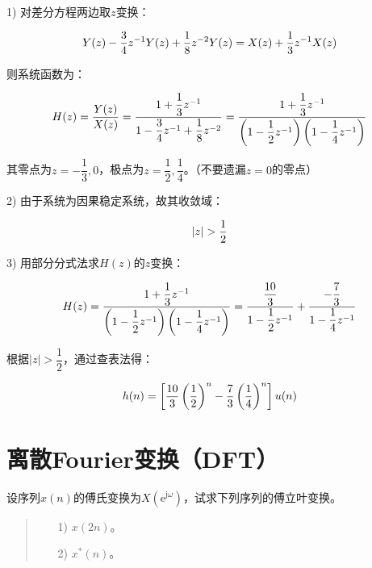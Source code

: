 \documentclass[cn, hazy, blue, normal, 14pt]{elegantnote}
\begin{document}
\begin{solution}[print=true]
    
1) 对差分方程两边取$z$变换：

\begin{equation}
\notag
    Y(z)-\frac{3}{4}z^{-1}Y(z)+\frac{1}{8}z^{-2}Y(z)=X(z)+\frac{1}{3}z^{-1}X(z)
\end{equation}

则系统函数为：

\begin{equation}
\notag
    H(z)=\dfrac{Y(z)}{X(z)}=\dfrac{1+\dfrac{1}{3}z^{-1}}{1-\dfrac{3}{4}z^{-1}+\dfrac{1}{8}z^{-2}}=\dfrac{1+\dfrac{1}{3}z^{-1}}{\left(1-\dfrac{1}{2}z^{-1}\right)\left(1-\dfrac{1}{4}z^{-1}\right)}
\end{equation}

其零点为$z=-\dfrac{1}{3}, 0$，极点为$z=\dfrac{1}{2}, \dfrac{1}{4}$。（不要遗漏$z=0$的零点）

2) 由于系统为因果稳定系统，故其收敛域：

\begin{equation}
    \notag
    |z|>\frac{1}{2}
\end{equation}

3) 用部分分式法求$H(z)$的$z$变换：

\begin{equation}
    \notag
    H(z)=\dfrac{1+\dfrac{1}{3}z^{-1}}{\left(1-\dfrac{1}{2}z^{-1}\right)\left(1-\dfrac{1}{4}z^{-1}\right)}=\dfrac{\dfrac{10}{3}}{1-\dfrac{1}{2}z^{-1}}+\dfrac{-\dfrac{7}{3}}{1-\dfrac{1}{4}z^{-1}}
\end{equation}

根据$|z|>\dfrac{1}{2}$，通过查表法得：

\begin{equation}
    \notag
    h(n)=\left[\dfrac{10}{3}\left(\dfrac{1}{2}\right)^n-\dfrac{7}{3}\left(\dfrac{1}{4}\right)^n\right]u(n)
\end{equation}

\end{solution}


\section{离散Fourier变换（DFT）}

\begin{exercise}

设序列$x(n)$的傅氏变换为$X\left(\text{e}^{\text{j}\omega}\right)$，试求下列序列的傅立叶变换。

\begin{quote}
\begin{itemize}
    \item[1)] $x(2n)$。
    \item[2)] $x^*(n)$。
\end{itemize}
\end{quote}

\end{exercise}
\end{document}
